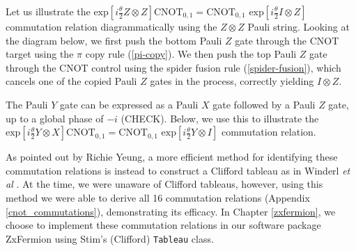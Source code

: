 
Let us illustrate the $\text{exp} \left[ i\frac{\theta}{2} Z \otimes Z \right] \text{CNOT}_{0, 1} = \text{CNOT}_{0, 1} \,\, \text{exp} \left[ i\frac{\theta}{2} I \otimes Z \right]$ commutation relation diagrammatically using the $Z \otimes Z$ Pauli string. Looking at the diagram below, we first push the bottom Pauli $Z$ gate through the CNOT target using the $\pi$ copy rule (\ref{pi-copy}). We then push the top Pauli $Z$ gate through the CNOT control using the spider fusion rule (\ref{spider-fusion}), which cancels one of the copied Pauli $Z$ gates in the process, correctly yielding $I \otimes Z$.


The Pauli $Y$ gate can be expressed as a Pauli $X$ gate followed by a Pauli $Z$ gate, up to a global phase of $-i$ (CHECK). Below, we use this to illustrate the $\text{exp} \left[ i\frac{\theta}{2} Y \otimes X \right] \text{CNOT}_{0, 1} = \text{CNOT}_{0, 1} \,\, \text{exp} \left[ i\frac{\theta}{2} Y \otimes I \right]$ commutation relation.



As pointed out by Richie Yeung, a more efficient method for identifying these commutation relations is instead to construct a Clifford tableau as in Winderl \textit{et al} \cite{Yeung2023}. At the time, we were unaware of Clifford tableaus, however, using this method we were able to derive all 16 commutation relations (Appendix \ref{cnot_commutations}), demonstrating its efficacy. In Chapter \ref{zxfermion}, we choose to implement these commutation relations in our software package ZxFermion using Stim's (Clifford) \lstinline{Tableau} class.

